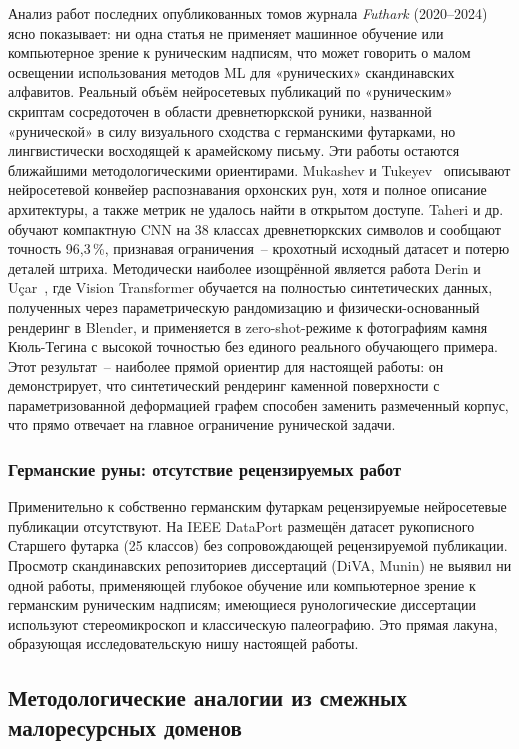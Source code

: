 \documentclass[a4paper,12pt]{extarticle}
\begin{document}
Анализ работ последних опубликованных томов журнала \textit{Futhark} (2020--2024) ясно показывает: ни одна статья не применяет машинное обучение или компьютерное зрение к руническим надписям, что может говорить о малом освещении использования методов ML для «рунических» скандинавских алфавитов. Реальный объём нейросетевых публикаций по «руническим» скриптам сосредоточен в области древнетюркской руники, названной «рунической» в силу визуального сходства с германскими футарками, но лингвистически восходящей к арамейскому письму. Эти работы остаются ближайшими методологическими ориентирами. Mukashev и Tukeyev~\cite{mukashev2024} описывают нейросетевой конвейер распознавания орхонских рун, хотя и полное описание архитектуры, а также метрик не удалось найти в открытом доступе. Taheri и др.~\cite{taheri2025} обучают компактную CNN на 38 классах древнетюркских символов и сообщают точность 96,3\,\%, признавая ограничения~-- крохотный исходный датасет и потерю деталей штриха. Методически наиболее изощрённой является работа Derin и Uçar~\cite{derin2024}, где Vision Transformer обучается на полностью синтетических данных, полученных через параметрическую рандомизацию и физически-основанный рендеринг в Blender, и применяется в zero-shot-режиме к фотографиям камня Кюль-Тегина с высокой точностью без единого реального обучающего примера. Этот результат~-- наиболее прямой ориентир для настоящей работы: он демонстрирует, что синтетический рендеринг каменной поверхности с параметризованной деформацией графем способен заменить размеченный корпус, что прямо отвечает на главное ограничение рунической задачи.

\subsubsection{Германские руны: отсутствие рецензируемых работ}

Применительно к собственно германским футаркам рецензируемые нейросетевые публикации отсутствуют. На IEEE DataPort размещён датасет рукописного Старшего футарка (25 классов) без сопровождающей рецензируемой публикации. Просмотр скандинавских репозиториев диссертаций (DiVA, Munin) не выявил ни одной работы, применяющей глубокое обучение или компьютерное зрение к германским руническим надписям; имеющиеся рунологические диссертации используют стереомикроскоп и классическую палеографию. Это прямая лакуна, образующая исследовательскую нишу настоящей работы.

\subsection{Методологические аналогии из смежных малоресурсных доменов}
\label{sec:lit-analog}
\end{document}
